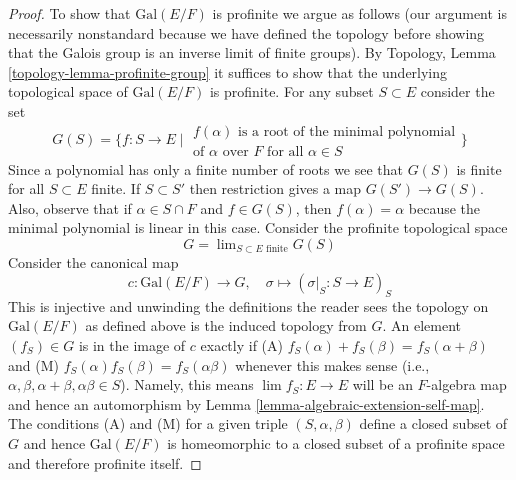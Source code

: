 \documentclass[10pt,a4paper]{amsart}
\theoremstyle{plain}
\theoremstyle{definition}
\theoremstyle{remark}
\numberwithin{equation}{subsection}
\def\lim{\mathop{\mathrm{lim}}\nolimits}
\begin{document}
\begin{proof}
\medskip\noindent
To show that $\text{Gal}(E/F)$ is profinite we argue as follows
(our argument is necessarily nonstandard because we have defined
the topology before showing that the Galois group is an inverse
limit of finite groups).
By Topology, Lemma \ref{topology-lemma-profinite-group}
it suffices to show that the underlying
topological space of $\text{Gal}(E/F)$ is profinite.
For any subset $S \subset E$ consider the set
$$
G(S) = \{ f : S \to E \mid
\begin{matrix}
f(\alpha)\text{ is a root of the minimal polynomial}\\
\text{of }\alpha\text{ over }F\text{ for all }\alpha \in S
\end{matrix}
\}
$$
Since a polynomial has only a finite number of roots we see that
$G(S)$ is finite for all $S \subset E$ finite. If $S \subset S'$
then restriction gives a map $G(S') \to G(S)$. Also, observe
that if $\alpha \in S \cap F$ and $f \in G(S)$, then $f(\alpha) = \alpha$
because the minimal polynomial is linear in this case.
Consider the profinite topological space
$$
G = \lim_{S \subset E\text{ finite}} G(S)
$$
Consider the canonical map
$$
c : \text{Gal}(E/F) \longrightarrow G,\quad
\sigma \longmapsto (\sigma|_S : S \to E)_S
$$
This is injective and unwinding the definitions the
reader sees the topology on $\text{Gal}(E/F)$ as defined above
is the induced topology from $G$. An element $(f_S) \in G$ is in
the image of $c$ exactly if
(A) $f_S(\alpha) + f_S(\beta) = f_S(\alpha + \beta)$ and
(M) $f_S(\alpha)f_S(\beta) = f_S(\alpha\beta)$ whenever
this makes sense (i.e.,
$\alpha, \beta, \alpha + \beta, \alpha\beta \in S$).
Namely, this means
$\lim f_S : E \to E$ will be an $F$-algebra map
and hence an automorphism by
Lemma \ref{lemma-algebraic-extension-self-map}.
The conditions (A) and (M) for a given triple
$(S, \alpha, \beta)$ define a closed subset of
$G$ and hence $\text{Gal}(E/F)$ is homeomorphic
to a closed subset of a profinite space and therefore
profinite itself.
\end{proof}
\end{document}
